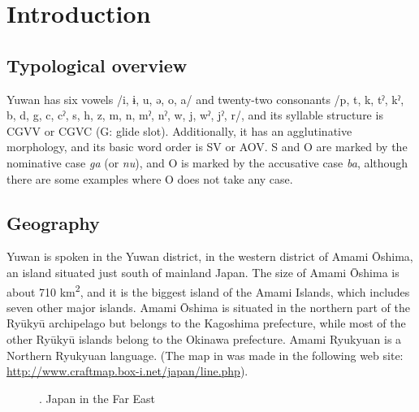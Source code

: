 \chapter{Introduction}\label{chap:1}
\hypertarget{RefHeadingToc395696949}{}
\section{Typological overview}
\hypertarget{RefHeadingToc395696950}{}
Yuwan has six vowels /i, ɨ, u, ə, o, a/ and twenty-two consonants /p, t, k, tˀ, kˀ, b, d, g, c, cˀ, s, h, z, m, n, mˀ, nˀ, w, j, wˀ, jˀ, r/, and its syllable structure is CGVV or CGVC (G: glide slot). Additionally, it has an agglutinative morphology, and its basic word order is SV or AOV. S and O are marked by the nominative case \textit{ga} (or \textit{nu}), and O is marked by the accusative case \textit{ba}, although there are some examples where O does not take any case.

\section{Geography}
\hypertarget{RefHeadingToc395696951}{}
Yuwan is spoken in the Yuwan district, in the western district of Amami Ōshima, an island situated just south of mainland Japan. The size of Amami Ōshima is about 710 km\textsuperscript{2}, and it is the biggest island of the Amami Islands, which includes seven other major islands. Amami Ōshima is situated in the northern part of the Ryūkyū archipelago but belongs to the Kagoshima prefecture, while most of the other Ryūkyū islands belong to the Okinawa prefecture. Amami Ryukyuan is a Northern Ryukyuan language. (The map in  was made in the following web site: \url{http://www.craftmap.box-i.net/japan/line.php}).

  
 

\begin{figure}
\textmd{. Japan in the Far East}
\end{figure}

  
              
